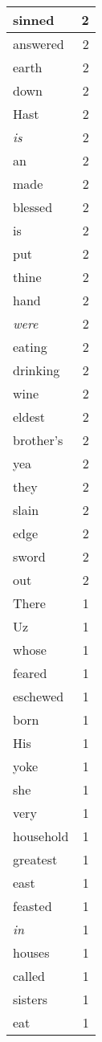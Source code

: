 \begin{center}
\begin{longtable}{l|r}
sinned & 2\\ \hline 
answered & 2\\ \hline 
earth & 2\\ \hline 
down & 2\\ \hline 
Hast & 2\\ \hline 
\emph{is} & 2\\ \hline 
an & 2\\ \hline 
made & 2\\ \hline 
blessed & 2\\ \hline 
is & 2\\ \hline 
put & 2\\ \hline 
thine & 2\\ \hline 
hand & 2\\ \hline 
\emph{were} & 2\\ \hline 
eating & 2\\ \hline 
drinking & 2\\ \hline 
wine & 2\\ \hline 
eldest & 2\\ \hline 
brother's & 2\\ \hline 
yea & 2\\ \hline 
they & 2\\ \hline 
slain & 2\\ \hline 
edge & 2\\ \hline 
sword & 2\\ \hline 
out & 2\\ \hline 
There & 1\\ \hline 
Uz & 1\\ \hline 
whose & 1\\ \hline 
feared & 1\\ \hline 
eschewed & 1\\ \hline 
born & 1\\ \hline 
His & 1\\ \hline 
yoke & 1\\ \hline 
she & 1\\ \hline 
very & 1\\ \hline 
household & 1\\ \hline 
greatest & 1\\ \hline 
east & 1\\ \hline 
feasted & 1\\ \hline 
\emph{in} & 1\\ \hline 
houses & 1\\ \hline 
called & 1\\ \hline 
sisters & 1\\ \hline 
eat & 1\\ \hline 

\end{longtable}
\end{center}
